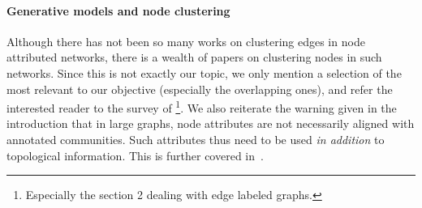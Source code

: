 \paragraph{Generative models and node clustering}
\label{par:erw_genmod}

Although there has not been so many works on clustering edges in node attributed networks, there is a
wealth of papers on clustering nodes in such networks. Since this is not exactly our topic, we only
mention a selection of the most relevant to our objective (especially the overlapping ones), and
refer the interested reader to the survey of
\textcite{surveyAttributedClustering15}\footnote{Especially the section 2 dealing with edge labeled
graphs.}. We also reiterate the warning given in the introduction that in large graphs, node
attributes are not necessarily aligned with annotated communities. Such attributes thus need to be
used \emph{in addition} to topological information. This is further covered in~\autocite[Section
3.4]{Fortunato2016}.

